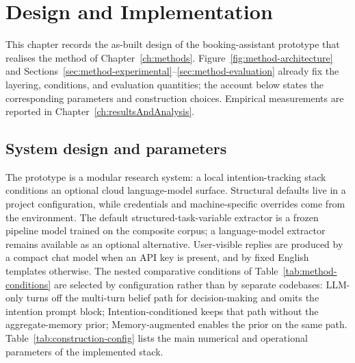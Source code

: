
\chapter{Design and Implementation}
\label{ch:whatYouDid}

This chapter records the as-built design of the booking-assistant prototype that realises the method of Chapter~\ref{ch:methods}.
Figure~\ref{fig:method-architecture} and Sections~\ref{sec:method-experimental}--\ref{sec:method-evaluation} already fix the layering, conditions, and evaluation quantities; the account below states the corresponding parameters and construction choices.
Empirical measurements are reported in Chapter~\ref{ch:resultsAndAnalysis}.

\section{System design and parameters}
\label{sec:construction-config}

The prototype is a modular research system: a local intention-tracking stack conditions an optional cloud language-model surface.
Structural defaults live in a project configuration, while credentials and machine-specific overrides come from the environment.
The default structured-task-variable extractor is a frozen pipeline model trained on the composite corpus; a language-model extractor remains available as an optional alternative.
User-visible replies are produced by a compact chat model when an API key is present, and by fixed English templates otherwise.
The nested comparative conditions of Table~\ref{tab:method-conditions} are selected by configuration rather than by separate codebases: LLM-only turns off the multi-turn belief path for decision-making and omits the intention prompt block; Intention-conditioned keeps that path without the aggregate-memory prior; Memory-augmented enables the prior on the same path.
Table~\ref{tab:construction-config} lists the main numerical and operational parameters of the implemented stack.

